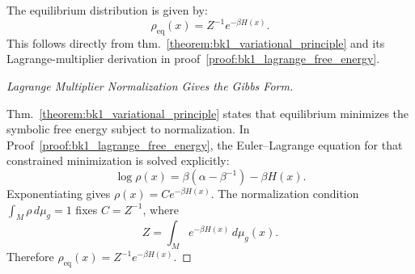 \begin{corollary}
\label{corollary:bk1_equilibrium_distribution}
The equilibrium distribution is given by:
\[
\rho_{\text{eq}}(x) = Z^{-1} e^{-\beta H(x)}.
\]
This follows directly from thm.~\ref{theorem:bk1_variational_principle} and its Lagrange-multiplier derivation in proof~\ref{proof:bk1_lagrange_free_energy}.
\end{corollary}
\begin{proof}[Lagrange Multiplier Normalization Gives the Gibbs Form]
\label{proof:bk1_equilibrium_distribution}
\leavevmode

Thm.~\ref{theorem:bk1_variational_principle} states that equilibrium minimizes
the symbolic free energy subject to normalization. In
Proof~\ref{proof:bk1_lagrange_free_energy}, the Euler--Lagrange equation for
that constrained minimization is solved explicitly:
\[
\log \rho(x)=\beta(\alpha-\beta^{-1})-\beta H(x).
\]
Exponentiating gives \(\rho(x)=C e^{-\beta H(x)}\). The normalization condition
\(\int_M\rho\,d\mu_g=1\) fixes \(C=Z^{-1}\), where
\[
Z=\int_M e^{-\beta H(x)}\,d\mu_g(x).
\]
Therefore \(\rho_{\mathrm{eq}}(x)=Z^{-1}e^{-\beta H(x)}\).
\end{proof}

